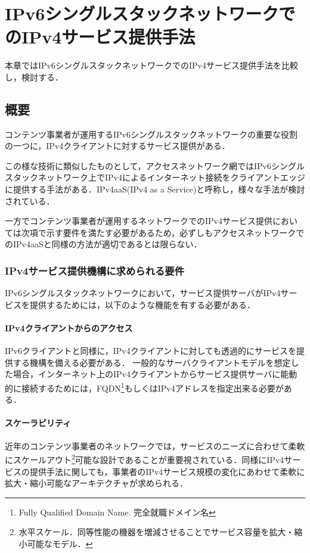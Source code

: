 \chapter{IPv6シングルスタックネットワークでのIPv4サービス提供手法}
\label{related}
本章ではIPv6シングルスタックネットワークでのIPv4サービス提供手法を比較し，検討する．


\section{概要}
\label{related:abstract}

コンテンツ事業者が運用するIPv6シングルスタックネットワークの重要な役割の一つに，IPv4クライアントに対するサービス提供がある．

この様な技術に類似したものとして，アクセスネットワーク網ではIPv6シングルスタックネットワーク上でIPv4によるインターネット接続をクライアントエッジに提供する手法がある．IPv4aaS(IPv4 as a Service)と呼称し，様々な手法が検討されている\cite{RFC8585}．

一方でコンテンツ事業者が運用するネットワークでのIPv4サービス提供においては次項で示す要件を満たす必要があるため，必ずしもアクセスネットワークでのIPv4aaSと同様の方法が適切であるとは限らない．

\subsection{IPv4サービス提供機構に求められる要件}
\label{related:abstract:requirements}
IPv6シングルスタックネットワークにおいて，サービス提供サーバがIPv4サービスを提供するためには，以下のような機能を有する必要がある．

\subsubsection{IPv4クライアントからのアクセス}
IPv6クライアントと同様に，IPv4クライアントに対しても透過的にサービスを提供する機構を備える必要がある．
一般的なサーバクライアントモデルを想定した場合，インターネット上のIPv4クライアントからサービス提供サーバに能動的に接続するためには，FQDN\footnote{Fully Qualified Domain Name. 完全就職ドメイン名}もしくはIPv4アドレスを指定出来る必要がある．


\subsubsection{スケーラビリティ}
近年のコンテンツ事業者のネットワークでは，サービスのニーズに合わせて柔軟にスケールアウト\footnote{水平スケール．同等性能の機器を増減させることでサービス容量を拡大・縮小可能なモデル．}可能な設計であることが重要視されている\cite{5550998}．同様にIPv4サービスの提供手法に関しても，事業者のIPv4サービス規模の変化にあわせて柔軟に拡大・縮小可能なアーキテクチャが求められる．

